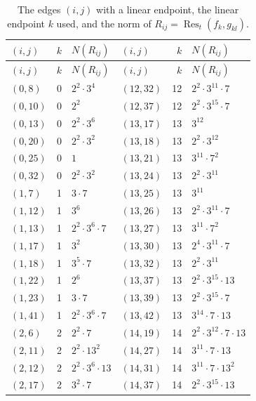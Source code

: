 \documentclass[11pt]{article}
\begin{document}
\begingroup\small
\setlength{\LTcapwidth}{\textwidth}
\begin{longtable}{@{}lrl@{\qquad}lrl@{}}
\caption{The edges $(i,j)$ with a linear endpoint, the linear endpoint $k$ used, and the norm of $R_{ij}=\operatorname{Res}_t(f_k,g_{kl})$.}\label{tab:sep}\\
\hline $(i,j)$ & $k$ & $N(R_{ij})$ & $(i,j)$ & $k$ & $N(R_{ij})$\\\hline\endfirsthead\hline $(i,j)$ & $k$ & $N(R_{ij})$ & $(i,j)$ & $k$ & $N(R_{ij})$\\\hline\endhead\hline\endfoot
$(0,8)$ & 0 & $2^{2}\cdot 3^{4}$ & $(12,32)$ & 12 & $2^{2}\cdot 3^{11}\cdot 7$\\
$(0,10)$ & 0 & $2^{2}$ & $(12,37)$ & 12 & $2^{2}\cdot 3^{15}\cdot 7$\\
$(0,13)$ & 0 & $2^{2}\cdot 3^{6}$ & $(13,17)$ & 13 & $3^{12}$\\
$(0,20)$ & 0 & $2^{2}\cdot 3^{2}$ & $(13,18)$ & 13 & $2^{2}\cdot 3^{12}$\\
$(0,25)$ & 0 & $1$ & $(13,21)$ & 13 & $3^{11}\cdot 7^{2}$\\
$(0,32)$ & 0 & $2^{2}\cdot 3^{2}$ & $(13,24)$ & 13 & $2^{2}\cdot 3^{11}$\\
$(1,7)$ & 1 & $3\cdot 7$ & $(13,25)$ & 13 & $3^{11}$\\
$(1,12)$ & 1 & $3^{6}$ & $(13,26)$ & 13 & $2^{2}\cdot 3^{11}\cdot 7$\\
$(1,13)$ & 1 & $2^{2}\cdot 3^{6}\cdot 7$ & $(13,27)$ & 13 & $3^{11}\cdot 7^{2}$\\
$(1,17)$ & 1 & $3^{2}$ & $(13,30)$ & 13 & $2^{4}\cdot 3^{11}\cdot 7$\\
$(1,18)$ & 1 & $3^{5}\cdot 7$ & $(13,32)$ & 13 & $2^{2}\cdot 3^{11}$\\
$(1,22)$ & 1 & $2^{6}$ & $(13,37)$ & 13 & $2^{2}\cdot 3^{15}\cdot 13$\\
$(1,23)$ & 1 & $3\cdot 7$ & $(13,39)$ & 13 & $2^{2}\cdot 3^{15}\cdot 7$\\
$(1,41)$ & 1 & $2^{2}\cdot 3^{6}\cdot 7$ & $(13,42)$ & 13 & $3^{14}\cdot 7\cdot 13$\\
$(2,6)$ & 2 & $2^{2}\cdot 7$ & $(14,19)$ & 14 & $2^{2}\cdot 3^{12}\cdot 7\cdot 13$\\
$(2,11)$ & 2 & $2^{2}\cdot 13^{2}$ & $(14,27)$ & 14 & $3^{11}\cdot 7\cdot 13$\\
$(2,12)$ & 2 & $2^{2}\cdot 3^{6}\cdot 13$ & $(14,31)$ & 14 & $3^{11}\cdot 7\cdot 13^{2}$\\
$(2,17)$ & 2 & $3^{2}\cdot 7$ & $(14,37)$ & 14 & $2^{2}\cdot 3^{15}\cdot 13$\\

\end{longtable}
\end{document}
